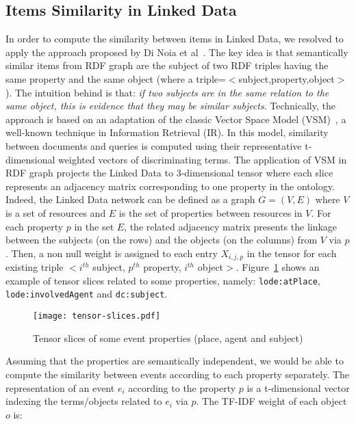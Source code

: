 \subsection{Items Similarity in Linked Data}
In order to compute the similarity between items in Linked Data, we resolved to apply the approach proposed by Di Noia et al~\cite{DiNoia:SEMANTICS12}. The key idea is that semantically similar items from RDF graph are the subject of two RDF triples having the same property and the same object (where a triple=$<$subject,property,object$>$). The intuition behind is that: \textit{if two subjects are in the same relation to the same object, this is evidence that they may be similar subjects}. Technically, the approach is based on an adaptation of the classic Vector Space Model (VSM)~\cite{Salton:CACM75}, a well-known technique in Information Retrieval (IR). In this model, similarity between documents and queries is computed using their representative t-dimensional weighted vectors of discriminating terms. The application of VSM in RDF graph projects the Linked Data to 3-dimensional tensor where each slice represents an adjacency matrix corresponding to one property in the ontology. Indeed, the Linked Data network can be defined as a graph $G=(V,E)$ where $V$ is a set of resources and $E$ is the set of properties between resources in $V$. For each property $p$ in the set $E$, the related adjacency matrix presents the linkage between the subjects (on the rows) and the objects (on the columns) from $V$ via $p$. Then, a non null weight is assigned to each entry $X_{i,j,p}$ in the tensor for each existing triple $<i^{th}$ subject, $p^{th}$ property, $i^{th}$ object$>$. Figure~\ref{fig:tensor-slices} shows an example of tensor slices related to some properties, namely: \texttt{lode:atPlace}, \texttt{lode:involvedAgent} and \texttt{dc:subject}.

\begin{figure}
  \centering
  \texttt{[image: tensor-slices.pdf]}
  \caption{Tensor slices of some event properties (place, agent and subject)}
  \label{fig:tensor-slices}
\end{figure}

Assuming that the properties are semantically independent, we would be able to compute the similarity between events according to each property separately. The representation of an event $e_{i}$ according to the property $p$ is a t-dimensional vector indexing the terms/objects related to $e_{i}$ via $p$. The TF-IDF weight of each object $o$ is:

